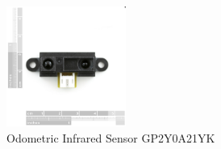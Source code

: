 \begin{figure}[!htbp]
\centering
       \includegraphics[page=1,width=0.35\textwidth]{img/sensor.png} 
\caption{Odometric Infrared Sensor GP2Y0A21YK}
\label{fig:sensor}
\end{figure}